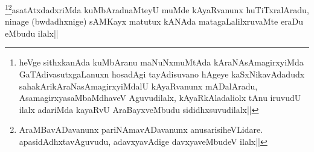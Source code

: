 
\begin{artha}
\footnote{heVge sithxkanAda kuMbAranu maNuNxmuMtAda kAraNAsAmagirxyiMda GaTAdivasutxgaLanuxn hosadAgi tayAdisuvano hAgeye kaSxNikavAdadudx sahakArikAraNasAmagirxyiMdalU kAyaRvanunx mADalAradu, AsamagirxyasaMbaMdhaveV Aguvudilalx, kAyaRkAladaliolx tAnu iruvudU ilalx adariMda kayaRvU AraBayxveMbudu sididhxsuvudilalx||}\footnote{AraMBavADavanunx pariNAmavADavanunx anusarisiheVLidare. apasidAdhxtavAguvudu, adavxyavAdige davxyaveMbudeV ilalx||}asatAtxdadxriMda kuMbAradnaMteyU muMde kAyaRvanunx huTiTxralAradu, ninage (bwdadhxnige) sAMKayx matutux kANAda matagaLalilxruvaMte eraDu eMbudu ilalx||
\end{artha}

